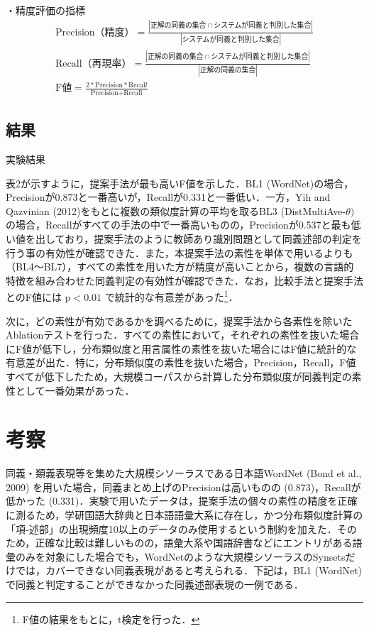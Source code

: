 \documentclass[japanese]{jnlp_1.4}
\begin{document}
・精度評価の指標
\begin{gather*}
 \text{Precision（精度）}= \frac{|\text{正解の同義の集合} \cap \text{システムが同義と判別した集合}|}{|\text{システムが同義と判別した集合}|} \\
 \text{Recall（再現率）} = \frac{|\text{正解の同義の集合} \cap \text{システムが同義と判別した集合}|}{|\text{正解の同義の集合}|} \\
 \mathrm{F}値 = \frac{2 * \text{Precision} * \text{Recal}l}{\text{Precision} + \text{Recall}}
\end{gather*}


\subsection{結果}

\begin{table}[b]
\caption{実験結果}

\end{table}

表2が示すように，提案手法が最も高いF値を示した．BL1 (WordNet)の場合，Precisionが0.873と一番高いが，Recallが0.331と一番低い．一方，Yih and Qazvinian (2012)をもとに複数の類似度計算の平均を取るBL3 (DistMultiAve-$\theta)$の場合，Recallがすべての手法の中で一番高いものの，Precisionが0.537と最も低い値を出しており，提案手法のように教師あり識別問題として同義述部の判定を行う事の有効性が確認できた．また，本提案手法の素性を単体で用いるよりも（BL4〜BL7），すべての素性を用いた方が精度が高いことから，複数の言語的特徴を組み合わせた同義判定の有効性が確認できた．なお，比較手法と提案手法とのF値には $\mathrm{p} < 0.01$ で統計的な有意差があった\footnote{F値の結果をもとに，t検定を行った．}．


次に，どの素性が有効であるかを調べるために，提案手法から各素性を除いたAblationテストを行った．すべての素性において，それぞれの素性を抜いた場合にF値が低下し，分布類似度と用言属性の素性を抜いた場合にはF値に統計的な有意差が出た．特に，分布類似度の素性を抜いた場合，Precision，Recall，F値すべてが低下したため，大規模コーパスから計算した分布類似度が同義判定の素性として一番効果があった．


\section{考察}

同義・類義表現等を集めた大規模シソーラスである日本語WordNet (Bond et al., 2009) を用いた場合，同義まとめ上げのPrecisionは高いものの (0.873)，Recallが低かった (0.331)．実験で用いたデータは，提案手法の個々の素性の精度を正確に測るため，学研国語大辞典と日本語語彙大系に存在し，かつ分布類似度計算の「項‐述部」の出現頻度10以上のデータのみ使用するという制約を加えた．そのため，正確な比較は難しいものの，語彙大系や国語辞書などにエントリがある語彙のみを対象にした場合でも，WordNetのような大規模シソーラスのSynsetsだけでは，カバーできない同義表現があると考えられる．下記は，BL1 (WordNet) で同義と判定することができなかった同義述部表現の一例である．
\end{document}
